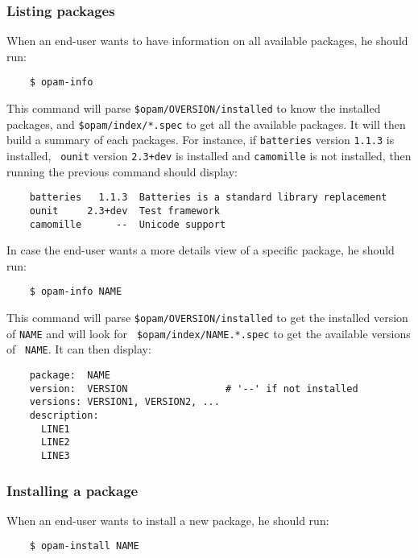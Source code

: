 \documentclass[a4paper,11pt]{article}
\begin{document}
\subsubsection{Listing packages}

When an end-user wants to have information on all available packages,
he should run:

\begin{verbatim}
    $ opam-info
\end{verbatim}

This command will parse {\tt \$opam/OVERSION/installed} to know the
installed packages, and {\tt \$opam/index/*.spec} to get all the
available packages. It will then build a summary of each packages. For
instance, if {\tt batteries} version {\tt 1.1.3} is installed, {\tt
  ounit} version {\tt 2.3+dev} is installed and {\tt camomille} is not
installed, then running the previous command should display:

\begin{verbatim}
    batteries   1.1.3  Batteries is a standard library replacement
    ounit     2.3+dev  Test framework
    camomille      --  Unicode support
\end{verbatim}


In case the end-user wants a more details view of a specific package,
he should run:

\begin{verbatim}
    $ opam-info NAME
\end{verbatim}

This command will parse {\tt \$opam/OVERSION/installed} to get the
installed version of {\tt NAME} and will look for {\tt
  \$opam/index/NAME.*.spec} to get the available versions of {\tt
  NAME}. It can then display:

\begin{verbatim}
    package:  NAME
    version:  VERSION                 # '--' if not installed
    versions: VERSION1, VERSION2, ...
    description:
      LINE1
      LINE2
      LINE3
\end{verbatim}

\subsubsection{Installing a package}
\label{install}

When an end-user wants to install a new package, he should run:

\begin{verbatim}
    $ opam-install NAME
\end{verbatim}
\end{document}
